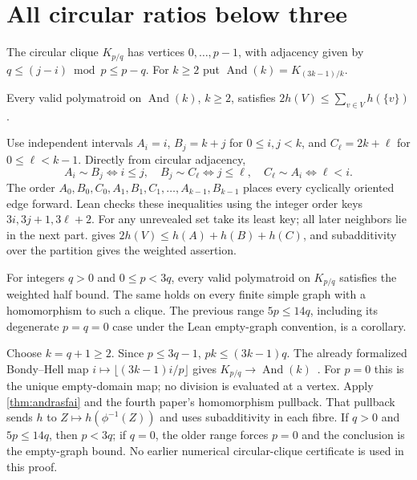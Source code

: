 \section{All circular ratios below three}

The circular clique $K_{p/q}$ has vertices $0,\ldots,p-1$, with
adjacency given by $q\le(j-i)\bmod p\le p-q$.
For $k\ge2$ put $\operatorname{And}(k)=K_{(3k-1)/k}$.

\begin{theorem}\label{thm:andrasfai}
Every valid polymatroid on $\operatorname{And}(k)$, $k\ge2$, satisfies
$2h(V)\le\sum_{v\in V}h(\{v\})$.
\end{theorem}
\begin{outline}
Use independent intervals
$A_i=i$, $B_j=k+j$ for $0\le i,j<k$, and
$C_\ell=2k+\ell$ for $0\le\ell<k-1$.
Directly from circular adjacency,
\[
 A_i\sim B_j\iff i\le j,\quad
 B_j\sim C_\ell\iff j\le\ell,\quad
 C_\ell\sim A_i\iff\ell<i.
\]
The order $A_0,B_0,C_0,A_1,B_1,C_1,\ldots,A_{k-1},B_{k-1}$
places every cyclically oriented edge forward. Lean checks these
inequalities using the integer order keys $3i,3j+1,3\ell+2$.
For any unrevealed set take its least key; all later neighbors lie
in the next part.  gives
$2h(V)\le h(A)+h(B)+h(C)$, and subadditivity over the partition
gives the weighted assertion.
\end{outline}

\begin{corollary}\label{cor:circular}
For integers $q>0$ and $0\le p<3q$, every valid polymatroid on
$K_{p/q}$ satisfies the weighted half bound. The same holds on every
finite simple graph with a homomorphism to such a clique.
The previous range $5p\le14q$, including its degenerate $p=q=0$
case under the Lean empty-graph convention, is a corollary.
\end{corollary}
\begin{outline}
Choose $k=q+1\ge2$. Since $p\le3q-1$,
$pk\le(3k-1)q$. The already formalized Bondy--Hell map
$i\mapsto\lfloor(3k-1)i/p\rfloor$ gives
$K_{p/q}\to\operatorname{And}(k)$~\cite{BondyHell1990}.
For $p=0$ this is the unique empty-domain map; no division is evaluated
at a vertex. Apply \cref{thm:andrasfai} and the fourth paper's
homomorphism pullback. That pullback sends $h$ to
$Z\mapsto h(\phi^{-1}(Z))$ and uses subadditivity in each fibre.
If $q>0$ and $5p\le14q$, then $p<3q$; if $q=0$, the older range
forces $p=0$ and the conclusion is the empty-graph bound.
No earlier numerical circular-clique certificate is used in this proof.
\end{outline}

